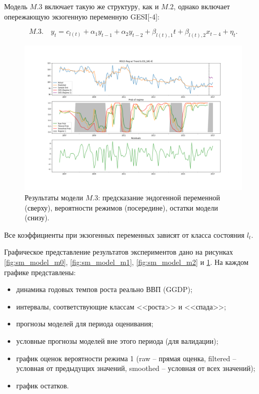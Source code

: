 \documentclass[a4paper,14pt]{extreport}
\begin{document}
Модель $M.3$ включает такую же структуру, как и $M.2$, однако включает опережающую экзогенную переменную GESI[-4]:

\begin{equation}
	M.3. \quad y_t = c_{l(t)} + \alpha_1 y_{t-1} + \alpha_2 y_{t-2} + \beta_{l(t), 1} t + \beta_{l(t), 2} x_{t-4} + \eta_t .
	\label{eq:ms_arx_m3}
\end{equation}

\begin{figure}[H]
	\includegraphics[width=\linewidth]{img/manual/model_m3.png}
	\caption{
		Результаты модели $M.3$: предсказание эндогенной переменной (сверху), вероятности режимов (посередине), остатки модели (снизу).
	}
	\label{fig:sm_model_m3}
\end{figure}

Все коэффициенты при экзогенных переменных зависят от класса состояния $l_t$.

Графическое представление результатов экспериментов дано на рисунках \ref{fig:sm_model_m0}, \ref{fig:sm_model_m1}, \ref{fig:sm_model_m2} и \ref{fig:sm_model_m3}. На каждом графике представлены:
\begin{itemize}
	\item динамика годовых темпов роста реально ВВП (GGDP);
	\item интервалы, соответствующие классам <<роста>> и <<спада>>;
	\item прогнозы моделей для периода оценивания;
	\item условные прогнозы моделей вне этого периода (для валидации);
	\item график оценок вероятности режима 1 (raw -- прямая оценка, filtered -- условная от предыдущих значений, smoothed -- условная от всех значений);
	\item график остатков.
\end{itemize}
\end{document}
